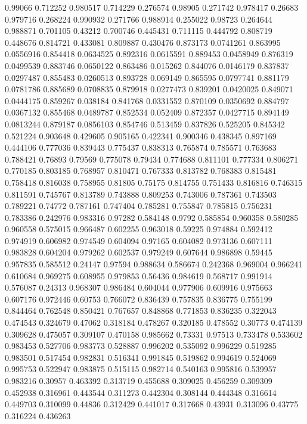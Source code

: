 0.99066 0.712252
0.980517 0.714229
0.276574 0.98905
0.271742 0.978417
0.26683 0.979716
0.268224 0.990932
0.271766 0.988914
0.255022 0.98723
0.264644 0.988871
0.701105 0.43212
0.700746 0.445431
0.711115 0.444792
0.808719 0.448676
0.814721 0.433081
0.809887 0.430476
0.873173 0.0741261
0.863995 0.0556916
0.854418 0.0634525
0.892316 0.0615591
0.889453 0.0458949
0.876319 0.0499539
0.883746 0.0650122
0.863486 0.015262
0.844076 0.0146179
0.837837 0.0297487
0.855483 0.0260513
0.893728 0.069149
0.865595 0.0797741
0.881179 0.0781786
0.885689 0.0708835
0.879918 0.0277473
0.839201 0.0420025
0.849071 0.0444175
0.859267 0.038184
0.841768 0.0331552
0.870109 0.0350692
0.884797 0.0367132
0.855468 0.0489787
0.852534 0.052409
0.872357 0.0427715
0.894149 0.0813244
0.879187 0.0856103
0.854746 0.513459
0.837826 0.525205
0.845342 0.521224
0.903648 0.429605
0.905165 0.422341
0.900346 0.438345
0.897169 0.444106
0.777036 0.839443
0.775437 0.838313
0.765874 0.785571
0.763683 0.788421
0.76893 0.79569
0.775078 0.79434
0.774688 0.811101
0.777334 0.806271
0.770185 0.803185
0.768957 0.810471
0.767333 0.813782
0.768383 0.815481
0.758418 0.816038
0.758955 0.81805
0.75175 0.814755
0.751433 0.816816
0.746315 0.811591
0.745767 0.813789
0.743888 0.809253
0.743006 0.787361
0.743503 0.789221
0.74772 0.787161
0.747404 0.785281
0.755847 0.785815
0.756231 0.783386
0.242976 0.983316
0.97282 0.584148
0.9792 0.585854
0.960358 0.580285
0.960558 0.575015
0.966487 0.602255
0.963018 0.59225
0.974884 0.592412
0.974919 0.606982
0.974549 0.604094
0.97165 0.604082
0.973136 0.607111
0.983828 0.604204
0.979262 0.602537
0.979249 0.607644
0.986898 0.59445
0.957835 0.585512
0.24147 0.97594
0.988634 0.586674
0.242368 0.969004
0.966241 0.610684
0.969275 0.608955
0.979853 0.56436
0.984619 0.568717
0.991914 0.576087
0.24313 0.968307
0.986484 0.604044
0.977906 0.609916
0.975663 0.607176
0.972446 0.60753
0.766072 0.836439
0.757835 0.836775
0.755199 0.844464
0.762548 0.850421
0.767657 0.848868
0.771853 0.836235
0.322043 0.474543
0.324679 0.47062
0.318184 0.478267
0.320185 0.478552
0.30773 0.474139
0.309628 0.475057
0.309107 0.470158
0.985662 0.73331
0.97513 0.733478
0.533602 0.983453
0.527706 0.983773
0.528887 0.996202
0.535092 0.996229
0.519285 0.983501
0.517454 0.982831
0.516341 0.991845
0.519862 0.994619
0.524069 0.995753
0.522947 0.983875
0.515115 0.982714
0.540163 0.995816
0.539957 0.983216
0.30957 0.463392
0.313719 0.455688
0.309025 0.456259
0.309309 0.452938
0.316961 0.443544
0.311273 0.442304
0.308144 0.444348
0.316614 0.449703
0.310099 0.44836
0.312429 0.441017
0.317668 0.43931
0.313096 0.43775
0.316224 0.436263
